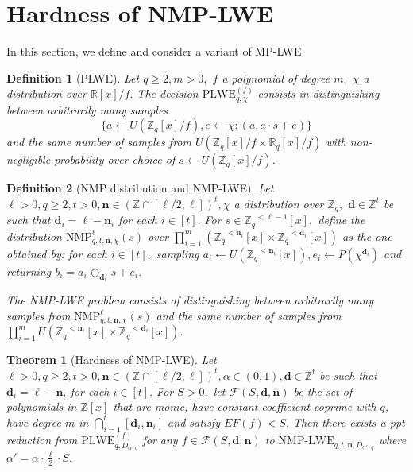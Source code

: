 \documentclass[11pt]{article}
\newcommand{\poly}[2]{{#1}^{<#2}[x]}
\newcommand{\Z}{\mathbb{Z}}
\newcommand{\R}{\mathbb{R}}
\newcommand{\middleProduct}[1]{\, \odot_{#1} \,}
\newcommand{\sample}{\leftarrow}
\newtheorem{theorem}{Theorem}[section]
\newtheorem{definition}{Definition}[section]
\newcommand{\NMP}{\text{NMP}}
\newcommand{\PLWE}[2]{\text{PLWE}_{q,#1}^{(#2)}}
\begin{document}
\section{Hardness of NMP-LWE}
In this section, we define and consider a variant of MP-LWE 
\begin{definition}[PLWE] \label{def:PLWEAssumption}
Let $q \geq 2, m > 0, $ $f$ a polynomial of degree $m,$ $\chi$ a distribution over $\R[x]/f.$ The decision $\text{PLWE}^{(f)}_{q, \chi}$ consists in distinguishing between arbitrarily many samples $$\{a \sample U(\Z_q[x]/f), e \sample \chi: (a,a\cdot s + e) \}$$ and the same number of samples from $U(\Z_q[x]/f \times \R_q[x]/f)$ with non-negligible probability over choice of $s\sample U(\Z_q[x]/f).$
\end{definition}
\begin{definition}[NMP distribution and NMP-LWE]
Let $\ell > 0, q \geq 2, t >0, \textbf{n} \in (\Z\cap [\ell/2,\ell])^t, \chi$ a distribution over $\Z_q,$ $\textbf{d} \in \Z^t$ be such that $\textbf{d}_i = \ell-\textbf{n}_i$ for each $i\in [t].$ For $s \in \poly{\Z_q}{\ell-1},$ define the distribution $\NMP^{\ell}_{q,t,\textbf{n},\chi}(s)$ over $\prod_{i=1}^m (\poly{\Z_q}{\textbf{n}_i} \times \poly{\Z_q}{\textbf{d}_i})$ as the one obtained by: for each $i\in [t],$ sampling $a_i \leftarrow U(\poly{\Z_q}{\textbf{n}_i}), e_i \leftarrow P(\chi^{\textbf{d}_i})$ and returning $b_i = a_i \middleProduct{\textbf{d}_i} s + e_i . $

The NMP-LWE problem consists of distinguishing between arbitrarily many samples from $\NMP^{\ell}_{q,t,\textbf{n},\chi}(s)$ and the same number of samples from $\prod_{i=1}^m U(\poly{\Z_q}{\textbf{n}_i} \times \poly{\Z_q}{\textbf{d}_i}).$
\end{definition}
\begin{theorem}[Hardness of NMP-LWE] \label{thm:mplwe}
Let $\ell > 0, q \geq 2, t >0, \textbf{n} \in (\Z\cap [\ell/2,\ell])^t, \alpha \in (0,1), \textbf{d} \in \Z^t$ be such that $\textbf{d}_i = \ell-\textbf{n}_i$ for each $i\in [t].$ For $S >0,$ let $\mathcal{F}(S, \textbf{d}, \textbf{n})$ be the set of polynomials in $\Z[x]$ that are monic, have constant coefficient coprime with $q$, have degree $m$ in $\bigcap_{i=1}^t [\textbf{d}_i, \textbf{n}_i]$ and satisfy $EF(f) < S.$ Then there exists a ppt reduction from $\PLWE{D_{\alpha\cdot q}}{f}$ for any $f \in \mathcal{F}(S, \textbf{d}, \textbf{n})$ to $\text{NMP-LWE}_{q,t,\textbf{n},D_{\alpha'\cdot q} }$ where $\alpha' = \alpha \cdot \frac{\ell}{2} \cdot S.$
\end{theorem}
\end{document}
